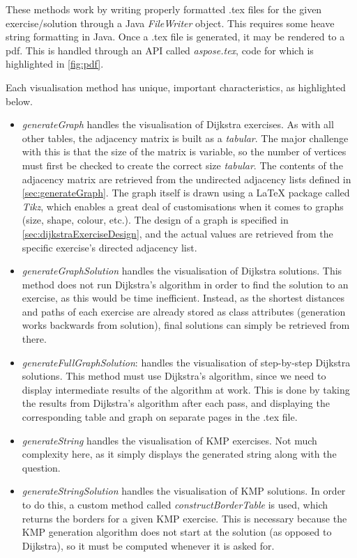 \documentclass{l4proj}
\begin{document}
These methods work by writing properly formatted .tex files for the given exercise/solution through a Java \emph{FileWriter} object. This requires some heave string formatting in Java. Once a .tex file is generated, it may be rendered to a pdf. This is handled through an API called \emph{aspose.tex}, code for which is highlighted in \autoref{fig:pdf}.

Each visualisation method has unique, important characteristics, as highlighted below.

\begin{itemize}
	\item
	\emph{generateGraph} handles the visualisation of Dijkstra exercises. As with all other tables, the adjacency matrix is built as a \emph{tabular}. The major challenge with this is that the size of the matrix is variable, so the number of vertices must first be checked to create the correct size \emph{tabular}. The contents of the adjacency matrix are retrieved from the undirected adjacency lists defined in \autoref{sec:generateGraph}. The graph itself is drawn using a LaTeX package called \emph{Tikz}, which enables a great deal of customisations when it comes to graphs (size, shape, colour, etc.). The design of a graph is specified in \autoref{sec:dijkstraExerciseDesign}, and the actual values are retrieved from the specific exercise's directed adjacency list.
	\item
	\emph{generateGraphSolution} handles the visualisation of Dijkstra solutions. This method does not run Dijkstra's algorithm in order to find the solution to an exercise, as this would be time inefficient. Instead, as the shortest distances and paths of each exercise are already stored as class attributes (generation works backwards from solution), final solutions can simply be retrieved from there.
	\item
	\emph{generateFullGraphSolution}: handles the visualisation of step-by-step Dijkstra solutions. This method must use Dijkstra's algorithm, since we need to display intermediate results of the algorithm at work. This is done by taking the results from Dijkstra's algorithm after each pass, and displaying the corresponding table and graph on separate pages in the .tex file.  
	\item
	\emph{generateString} handles the visualisation of KMP exercises. Not much complexity here, as it simply displays the generated string along with the question.
	\item
	\emph{generateStringSolution} handles the visualisation of KMP solutions. In order to do this, a custom method called \emph{constructBorderTable} is used, which returns the borders for a given KMP exercise. This is necessary because the KMP generation algorithm does not start at the solution (as opposed to Dijkstra), so it must be computed whenever it is asked for.

\end{itemize}
\end{document}
